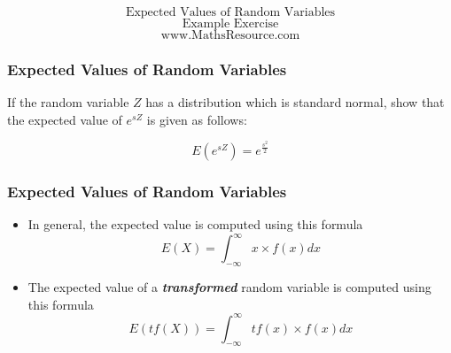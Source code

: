 \documentclass{beamer}
\begin{document}
	
	\begin{frame}
		\bigskip
		{
			\huge
			\[ \mbox{Expected Values of Random Variables}\]
			\Large
			\[ \mbox{Example Exercise}\]
			\bigskip
			\Large
			\[ \mbox{www.MathsResource.com}\]
		}
		
	\end{frame}
	\begin{frame}
		\frametitle{Expected Values of Random Variables}
		\Large
		If the random variable $Z$ has a distribution which is standard normal, show that the expected value of $e^{sZ}$ is given as follows:
		
		{
			\LARGE
			\[E(e^{sZ})  =  e^{\frac{s^2}{2}}\] 
		}
		
		
	\end{frame}
	
	\begin{frame}
		\frametitle{Expected Values of Random Variables}
		\Large
		\begin{itemize}
			\item In general, the expected value is computed using this formula
			{
				\LARGE
				\[ E(X) =  \int_{-\infty}^{\infty}  x \times f(x) dx   \]
			}
			\item The expected value of a \textbf{\textit{transformed}} random variable is computed using this formula
			{
				\LARGE
				\[ E( tf(X) ) =  \int_{-\infty}^{\infty}  tf(x) \times f(x) dx   \]
			}
		\end{itemize}
		
	\end{frame}
	
\end{document}
